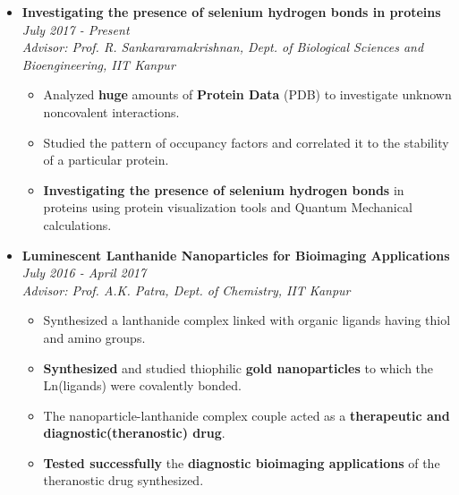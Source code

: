 \documentclass{article}
\begin{document}
\begin{itemize}

\item \textbf{Investigating the presence of selenium hydrogen bonds in proteins}
     \hfill\textit{July 2017 - Present}
     \\[0pt]  \textit{\small	 Advisor: Prof. R. Sankararamakrishnan, Dept. of Biological Sciences and Bioengineering, IIT Kanpur}  
    \begin{itemize}
        \item Analyzed \textbf{huge} amounts of \textbf{Protein Data} (PDB) to investigate unknown noncovalent interactions.    
        \item Studied the pattern of occupancy factors and correlated it to the stability of a particular protein. 
        \item \textbf{Investigating the presence of selenium hydrogen bonds} in proteins using protein visualization tools and Quantum Mechanical calculations.
        
        \vspace{-1mm}
    \end{itemize}
    \vspace{1.5mm}
     \item \textbf{Luminescent Lanthanide Nanoparticles for Bioimaging Applications}
     \vspace{-1mm}
     \hfill\textit{July 2016 - April 2017}
     \\[3pt]  \textit{\small Advisor: Prof. A.K. Patra, Dept. of Chemistry, IIT Kanpur } 
    \begin{itemize}
        \item Synthesized a lanthanide complex linked with organic ligands having thiol and amino groups.
        \item \textbf{Synthesized} and studied thiophilic \textbf{gold nanoparticles} to which the Ln(ligands) were covalently bonded.
        \item The nanoparticle-lanthanide complex couple acted as a \textbf{therapeutic and diagnostic(theranostic) drug}.  
     \item \textbf{Tested successfully} the \textbf{diagnostic bioimaging applications} of the theranostic drug synthesized.
    \end{itemize}
    
\end{itemize}

\vspace{-2mm}
\end{document}
